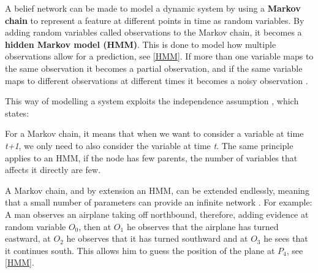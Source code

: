 A belief network can be made to model a dynamic system by using a \textbf{Markov
chain} to represent a feature at different points in time as random
variables. By adding random variables called observations to the
Markov chain, it becomes a \textbf{hidden Markov model (HMM)}. This is done to
model how multiple observations allow for a prediction, see \autoref{HMM}. If
more than one variable maps to the same observation it becomes a partial
observation, and if the same variable maps to different observations at
different times it becomes a noisy observation \citep[ch.6.5.2]{MIBook}.

This way of modelling a system exploits the independence assumption
\citep[p.240]{MIBook}, which states:
 
 \begin{center}
 \begin{minipage}{0.8\linewidth}
 \end{minipage}
 \end{center}
 
For a Markov chain, it means that when we want to consider a variable at time
\textit{t+1}, we only need to also consider the variable at time
\textit{t}. The same principle applies to an HMM, if the node has few parents,
the number of variables that affects it directly are few.\nl

A Markov chain, and by extension an HMM, can be extended endlessly, meaning
that a small number of parameters can provide an infinite network
\citep[ch.6.5.1]{MIBook}. For example: A man observes an airplane taking off
northbound, therefore, adding evidence at random variable $O_0$, then at $O_1$
he observes that the airplane has turned eastward, at $O_2$ he observes that it
has turned southward and at $O_3$ he sees that it continues south. This allows
him to guess the position of the plane at $P_4$, see \autoref{HMM}. 





